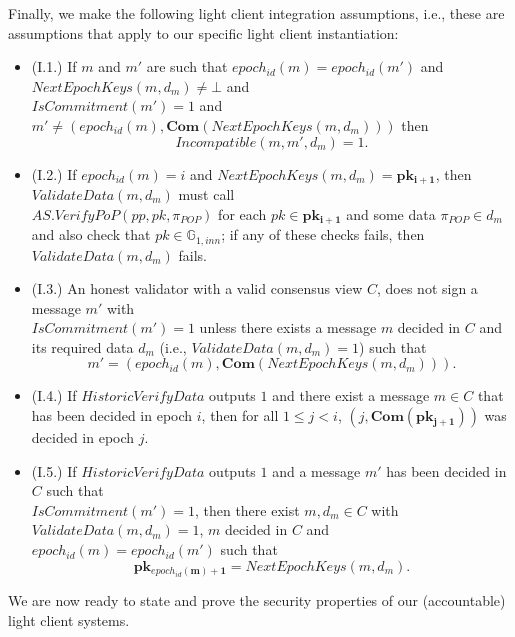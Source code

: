 \noindent Finally, we make the following light client integration assumptions, i.e., these are assumptions that 
apply to our specific light client instantiation: 
\begin{itemize}
\item (I.1.) If $m$ and $m'$ are such that 
$\mathit{epoch_{id}}(m) =\mathit{epoch_{id}}(m')$ and 
$\mathit{NextEpochKeys}(m, d_m) \neq \bot$ and \\
$\mathit{IsCommitment}(m') = 1$ and 
$m' \neq (\mathit{epoch_{id}}(m), \mathbf{Com}(\mathit{NextEpochKeys}(m, d_m)))$ 
then $$\mathit{Incompatible}(m, m', d_m)=1.$$
\item (I.2.) If $\mathit{epoch_{id}}(m) =i$ and $\mathit{NextEpochKeys}(m, d_m)=\mathbf{pk_{i+1}}$, 
then $\mathit{ValidateData}(m, d_m)$ must call \\ $\mathit{AS.VerifyPoP}(\mathit{pp}, \mathit{pk}, \mathit{\pi_{POP}})$ 
for each $pk \in \mathbf{pk_{i+1}}$ and some data $\mathit{\pi_{POP}} \in d_m$ and also check that
 $\mathit{pk} \in \mathbb{G}_{1,\mathit{inn}}$; if any of these checks fails, then $\mathit{ValidateData}(m, d_m)$ fails.
\item (I.3.) An honest validator with a valid consensus view $C$, does not sign a message $m'$ 
with \\ $\mathit{IsCommitment}(m')=1$ unless there exists a message $m$ decided in $C$ 
and its required data $d_m$ (i.e., $\mathit{ValidateData}(m, d_m) =1$) such that 
$$m'=(\mathit{epoch_{id}}(m), \mathbf{Com}(\mathit{NextEpochKeys}(m, d_m))).$$ 
\item (I.4.) If $\mathit{HistoricVerifyData}$ outputs $1$ and there exist a message $m \in C$ 
that has been decided in epoch $i$, then for all $1 \leq j < i$, $(j, \mathbf{Com}(\mathbf{pk_{j+1}}))$ was decided in epoch $j$. 
\item (I.5.) If $\mathit{HistoricVerifyData}$ outputs $1$ and a message $m'$ has been decided in $C$ 
such that \\ $\mathit{IsCommitment}(m') = 1$, then there exist $m, d_m \in C$ with $\mathit{ValidateData}(m, d_m) = 1$, $m$ decided in $C$
and $\mathit{epoch_{id}}(m) = \mathit{epoch_{id}}(m')$ such that 
$$\mathbf{pk_{\mathit{epoch_{id}}(m)+1}} = \mathit{NextEpochKeys}(m, d_m).$$
\end{itemize}

\noindent We are now ready to state and prove the security properties of our (accountable) light client systems. 

